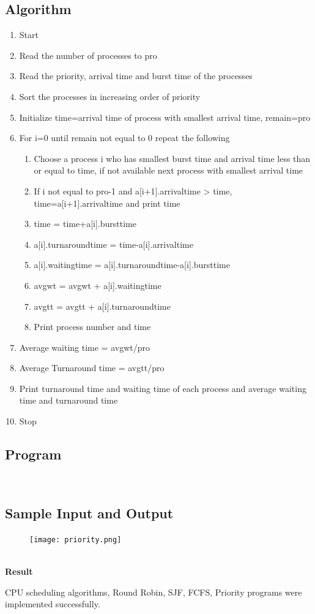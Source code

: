 \documentclass[a4paper]{article}
\begin{document}
\subsection{Algorithm}
\begin{enumerate}
\item Start
\item Read the number of processes to pro
\item Read the priority, arrival time and burst time of the processes
\item Sort the processes in increasing order of priority
\item Initialize time=arrival time of process with smallest arrival time, remain=pro
\item For i=0 until remain not equal to 0 repeat the following
\begin{enumerate}
\item Choose a process i who has smallest burst time and arrival time less than or equal to time, if not available next process with smallest arrival time
\item If i not equal to pro-1 and a[i+1].arrivaltime > time, time=a[i+1].arrivaltime and print time
\item time = time+a[i].bursttime
\item a[i].turnaroundtime = time-a[i].arrivaltime
\item a[i].waitingtime = a[i].turnaroundtime-a[i].bursttime
\item avgwt = avgwt + a[i].waitingtime
\item avgtt = avgtt + a[i].turnaroundtime
\item Print process number and time
\end{enumerate}
\item Average waiting time = avgwt/pro
\item Average Turnaround time = avgtt/pro
\item Print turnaround time and waiting time of each process and average waiting time and turnaround time
\item Stop
\end{enumerate}
\subsection{Program}

\\
\newpage
\subsection{Sample Input and Output}
\begin{figure}[!h]
	\centering
	\texttt{[image: priority.png]}
\end{figure}

\textbf{{\Large\\ Result
}}\\
\vspace{1.5pt}
\par CPU scheduling algorithms, Round Robin, SJF, FCFS, Priority programs were implemented successfully.
\end{document}
